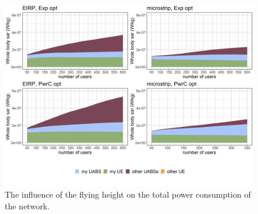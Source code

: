 \begin{figure}[h!]
  \includegraphics[width=\textwidth]{../results/s3/uFourSources.png}
  \caption{The influence of the flying height on the total power consumption of the network.}
  \label{fig:s3b_fourSourcesMatrix}
\end{figure}